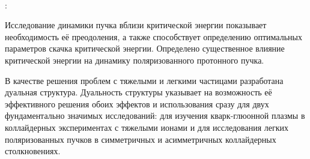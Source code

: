 ~\\
\par {\influence}:
\par Исследование динамики пучка вблизи критической энергии показывает необходимость её преодоления, а также  способствует определению оптимальных параметров скачка критической энергии. Определено существенное влияние критической энергии на динамику поляризованного протонного пучка.

\par В качестве решения проблем с тяжелыми и легкими частицами разработана дуальная структура. Дуальность структуры указывает на возможность её эффективного решения обоих эффектов и использования сразу для двух фундаментально значимых исследований: для изучения кварк-глюонной плазмы в коллайдерных экспериментах с тяжелыми ионами и для исследования легких поляризованных пучков в симметричных и асимметричных коллайдерных столкновениях.

